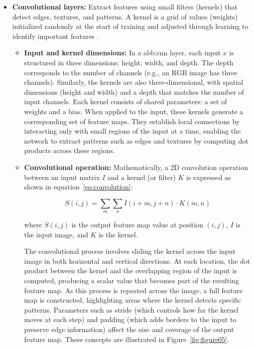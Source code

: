 \begin{itemize}
    \item \textbf{Convolutional layers:} Extract features using small filters (kernels) that detect edges, textures, and patterns. A kernel is a grid of values (weights) initialized randomly at the start of training and adjusted through learning to identify important features \parencite{alzubaidi2021review}.
     
    \begin{itemize}
        \item \textbf{Input and kernel dimensions:} In a \gls{abb:cnn} layer, each input $x$ is structured in three dimensions: height, width, and depth. The depth corresponds to the number of channels (e.g., an RGB image has three channels). Similarly, the kernels are also three-dimensional, with spatial dimensions (height and width) and a depth that matches the number of input channels. Each kernel consists of shared parameters: a set of weights and a bias. When applied to the input, these kernels generate a corresponding set of feature maps. They establish local connections by interacting only with small regions of the input at a time, enabling the network to extract patterns such as edges and textures by computing dot products across these regions.
        
        \item \textbf{Convolutional operation:} Mathematically, a 2D convolution operation between an input matrix $I$ and a kernel (or filter) $K$ is expressed as shown in equation~\ref{eq:convolution}:

        \begin{equation}
        S(i, j) = \sum_{m} \sum_{n} I(i + m, j + n) \cdot K(m, n)
        \label{eq:convolution}
        \end{equation}

        where $S(i, j)$ is the output feature map value at position $(i, j)$, $I$ is the input image, and $K$ is the kernel.

        The convolutional process involves sliding the kernel across the input image in both horizontal and vertical directions. At each location, the dot product between the kernel and the overlapping region of the input is computed, producing a scalar value that becomes part of the resulting feature map. As this process is repeated across the image, a full feature map is constructed, highlighting areas where the kernel detects specific patterns. Parameters such as stride (which controls how far the kernel moves at each step) and padding (which adds borders to the input to preserve edge information) affect the size and coverage of the output feature map. These concepts are illustrated in Figure~\ref{fig:figure05}.
    \end{itemize}


\end{itemize}
